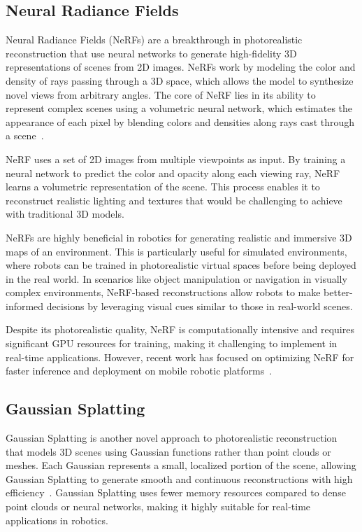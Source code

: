 \subsection{Neural Radiance Fields}

Neural Radiance Fields (NeRFs) are a breakthrough in photorealistic reconstruction that use neural networks to generate high-fidelity 3D representations of scenes from 2D images. NeRFs work by modeling the color and density of rays passing through a 3D space, which allows the model to synthesize novel views from arbitrary angles. The core of NeRF lies in its ability to represent complex scenes using a volumetric neural network, which estimates the appearance of each pixel by blending colors and densities along rays cast through a scene~\cite{nerf}.

NeRF uses a set of 2D images from multiple viewpoints as input. By training a neural network to predict the color and opacity along each viewing ray, NeRF learns a volumetric representation of the scene. This process enables it to reconstruct realistic lighting and textures that would be challenging to achieve with traditional 3D models.

NeRFs are highly beneficial in robotics for generating realistic and immersive 3D maps of an environment. This is particularly useful for simulated environments, where robots can be trained in photorealistic virtual spaces before being deployed in the real world. In scenarios like object manipulation or navigation in visually complex environments, NeRF-based reconstructions allow robots to make better-informed decisions by leveraging visual cues similar to those in real-world scenes.

Despite its photorealistic quality, NeRF is computationally intensive and requires significant GPU resources for training, making it challenging to implement in real-time applications. However, recent work has focused on optimizing NeRF for faster inference and deployment on mobile robotic platforms~\cite{nerfhub}.

\subsection{Gaussian Splatting}

Gaussian Splatting is another novel approach to photorealistic reconstruction that models 3D scenes using Gaussian functions rather than point clouds or meshes. Each Gaussian represents a small, localized portion of the scene, allowing Gaussian Splatting to generate smooth and continuous reconstructions with high efficiency~\cite{3DGS}. Gaussian Splatting uses fewer memory resources compared to dense point clouds or neural networks, making it highly suitable for real-time applications in robotics.

